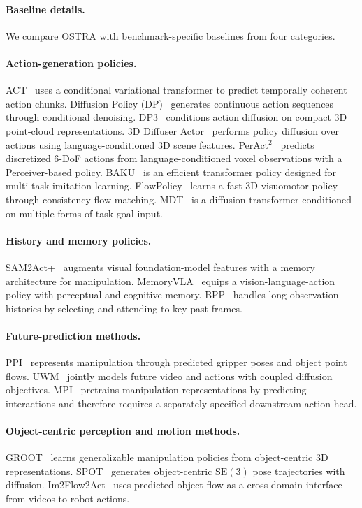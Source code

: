 \paragraph{Baseline details.}
\label{app:baseline_details}

We compare OSTRA with benchmark-specific baselines from four categories.

\paragraph{Action-generation policies.}
ACT~\citep{Zhao2023Learning} uses a conditional variational transformer to
predict temporally coherent action chunks.
Diffusion Policy (DP)~\citep{chi2024diffusionpolicy} generates continuous
action sequences through conditional denoising.
DP3~\citep{Ze2024DP3} conditions action diffusion on compact 3D point-cloud
representations.
3D Diffuser Actor~\citep{ke2024diffuseractor} performs policy diffusion over
actions using language-conditioned 3D scene features.
PerAct$^2$~\citep{shridhar2022peract} predicts discretized 6-DoF actions from
language-conditioned voxel observations with a Perceiver-based policy.
BAKU~\citep{Haldar2025BAKU} is an efficient transformer policy designed for
multi-task imitation learning.
FlowPolicy~\citep{zhang2024flowpolicy} learns a fast 3D visuomotor policy
through consistency flow matching.
MDT~\citep{reuss2024multimodal} is a diffusion transformer conditioned on
multiple forms of task-goal input.

\paragraph{History and memory policies.}
SAM2Act+~\citep{Fang2025SAM2Act} augments visual foundation-model features
with a memory architecture for manipulation.
MemoryVLA~\citep{shi2025memoryvla} equips a vision-language-action policy with
perceptual and cognitive memory.
BPP~\citep{Mark2026BPP} handles long observation histories by selecting and
attending to key past frames.

\paragraph{Future-prediction methods.}
PPI~\citep{Yang2025PPI} represents manipulation through predicted gripper
poses and object point flows.
UWM~\citep{Zhu2025UWM} jointly models future video and actions with coupled
diffusion objectives.
MPI~\citep{Zeng2024MPI} pretrains manipulation representations by predicting
interactions and therefore requires a separately specified downstream action
head.

\paragraph{Object-centric perception and motion methods.}
GROOT~\citep{zhu2023learning} learns generalizable manipulation policies from
object-centric 3D representations.
SPOT~\citep{Hsu2025SPOT} generates object-centric
$\mathrm{SE}(3)$ pose trajectories with diffusion.
Im2Flow2Act~\citep{xu2024im2flow2act} uses predicted object flow as a
cross-domain interface from videos to robot actions.
